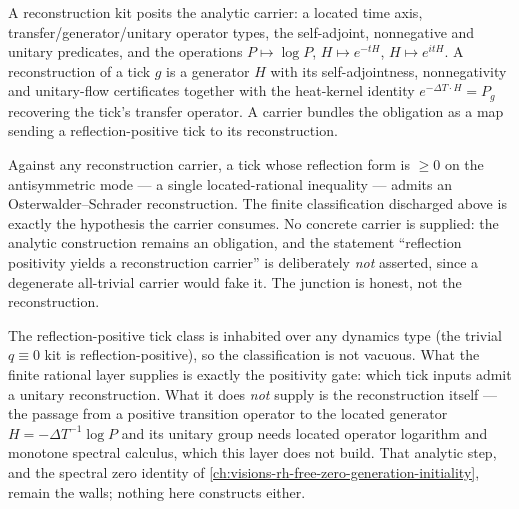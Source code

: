 \begin{definition}
\label{def:oclsd-os-reconstruction-carrier}
A reconstruction kit posits the analytic carrier: a located time axis, transfer/generator/unitary
operator types, the self-adjoint, nonnegative and unitary predicates, and the operations
$P\mapsto\log P$, $H\mapsto e^{-tH}$, $H\mapsto e^{itH}$. A reconstruction of a tick $g$ is a
generator $H$ with its self-adjointness, nonnegativity and unitary-flow certificates together
with the heat-kernel identity $e^{-\Delta T\cdot H}=P_g$ recovering the tick's transfer operator.
A carrier bundles the obligation as a map sending a reflection-positive tick to its reconstruction.
\end{definition}

\begin{theorem}
\label{thm:oclsd-os-reconstruction-bridge}
Against any reconstruction carrier, a tick whose reflection form is $\ge 0$ on the antisymmetric
mode --- a single located-rational inequality --- admits an Osterwalder--Schrader reconstruction.
The finite classification discharged above is exactly the hypothesis the carrier consumes. No
concrete carrier is supplied: the analytic construction remains an obligation, and the statement
``reflection positivity yields a reconstruction carrier'' is deliberately \emph{not} asserted, since
a degenerate all-trivial carrier would fake it. The junction is honest, not the reconstruction.
\end{theorem}

\begin{principle}
\label{prin:oclsd-reflection-boundary}
The reflection-positive tick class is inhabited over any dynamics type (the trivial
$q\equiv 0$ kit is reflection-positive), so the classification is not vacuous. What the
finite rational layer supplies is exactly the positivity gate: which tick inputs admit
a unitary reconstruction. What it does \emph{not} supply is the reconstruction itself
--- the passage from a positive transition operator to the located generator
$H=-\Delta T^{-1}\log P$ and its unitary group needs located operator logarithm and
monotone spectral calculus, which this layer does not build. That analytic step, and
the spectral zero identity of
\autoref{ch:visions-rh-free-zero-generation-initiality}, remain the walls; nothing here
constructs either.
\end{principle}
